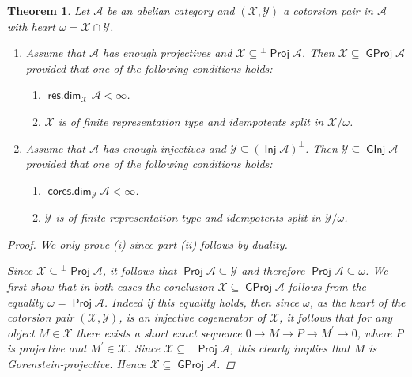 \documentclass[oneside, a4paper,reqno]{amsart}
\numberwithin{equation}{section}
\newtheorem{thm}{Theorem}[section]
\theoremstyle{definition}
\begin{document}
\begin{thm} Let ${\mathscr A}$ be an abelian category and $({\mathcal X},{\mathcal Y})$  a
cotorsion pair in ${\mathscr A}$ with heart $\omega = {\mathcal X} \cap {\mathcal Y}$.
\begin{enumerate}
\item Assume that  ${\mathscr A}$ has enough projectives and ${\mathcal X} \subseteq
{^{\bot}}\operatorname*{\mathsf{Proj}}{\mathscr A}$. Then ${\mathcal X} \subseteq {\operatorname{\mathsf{GProj}}\nolimits}{\mathscr A}$ provided that one of
the following conditions holds:
 \begin{enumerate}
 \item $\operatorname*{\mathsf{res.dim}}_{\mathcal X}{\mathscr A} < \infty$.
\item ${\mathcal X}$ is of finite representation type and idempotents split in
${\mathcal X}/\omega$.
 \end{enumerate}
\item Assume that ${\mathscr A}$ has enough injectives and ${\mathcal Y} \subseteq (\operatorname*{\mathsf{Inj}}{\mathscr A})^{\bot}$.
Then ${\mathcal Y} \subseteq {\operatorname{\mathsf{GInj}}\nolimits}{\mathscr A}$ provided that one of the following
conditions holds:
\begin{enumerate}
 \item $\operatorname*{\mathsf{cores.dim}}_{\mathcal Y}{\mathscr A} < \infty$.
\item ${\mathcal Y}$ is of finite representation type and idempotents split in
${\mathcal Y}/\omega$.
 \end{enumerate}
\end{enumerate}
\begin{proof} We only prove (i) since part (ii) follows by duality.

Since ${\mathcal X} \subseteq {^{\bot}}\operatorname*{\mathsf{Proj}}{\mathscr A}$, it follows that $\operatorname*{\mathsf{Proj}}{\mathscr A}
\subseteq {\mathcal Y}$ and therefore $\operatorname*{\mathsf{Proj}}{\mathscr A} \subseteq \omega$. We first show that in both
cases  the conclusion ${\mathcal X} \subseteq {\operatorname{\mathsf{GProj}}\nolimits}{\mathscr A}$
follows from the equality $\omega = \operatorname*{\mathsf{Proj}}{\mathscr A}$. Indeed if this
equality holds, then since $\omega$, as the heart of the cotorsion
pair $({\mathcal X},{\mathcal Y})$, is an injective cogenerator of ${\mathcal X}$, it follows that
for any object $M \in {\mathcal X}$ there exists a short exact sequence $0{\longrightarrow}
M {\longrightarrow} P {\longrightarrow} M^{\prime} {\longrightarrow} 0$, where $P$ is projective and
$M^{\prime} \in {\mathcal X}$. Since ${\mathcal X} \subseteq {^{\bot}}\operatorname*{\mathsf{Proj}}{\mathscr A}$, this
clearly implies that $M$ is Gorenstein-projective. Hence ${\mathcal X}
\subseteq {\operatorname{\mathsf{GProj}}\nolimits}{\mathscr A}$.


\end{proof}
\end{thm}
\end{document}
